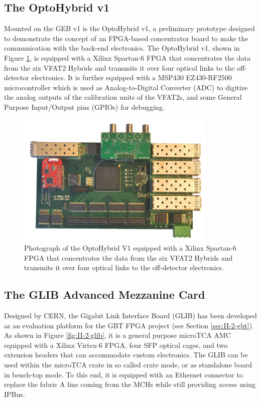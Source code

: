     \subsection{The OptoHybrid v1}

      Mounted on the GEB v1 is the OptoHybrid v1, a preliminary prototype designed to demonstrate the concept of an FPGA-based concentrator board to make the communication with the back-end electronics. The OptoHybrid v1, shown in Figure \ref{fig:II-2-ohv1}, is equipped with a Xilinx Spartan-6 FPGA that concentrates the data from the six VFAT2 Hybrids and transmits it over four optical links to the off-detector electronics. It is further equipped with a MSP430 EZ430-RF2500 \cite{MSP430} microcontroller which is used as Analog-to-Digital Converter (ADC) to digitize the analog outputs of the calibration units of the VFAT2s, and some General Purpose Input/Output pins (GPIOs) for debugging.

      \begin{figure}[b!]
        \centering
        \includegraphics[width=0.85\textwidth]{img/II-2-daq/oh-v1.jpg}
        \caption{Photograph of the OptoHybrid V1 equipped with a Xilinx Spartan-6 FPGA that concentrates the data from the six VFAT2 Hybrids and transmits it over four optical links to the off-detector electronics.}
        \label{fig:II-2-ohv1}
      \end{figure}

    \subsection{The GLIB Advanced Mezzanine Card}

      Designed by CERN, the Gigabit Link Interface Board (GLIB) \cite{Vichoudis:1359270} has been developed as an evaluation platform for the GBT FPGA project (see Section \ref{sec:II-2-gbt}). As shown in Figure \ref{fig:II-2-glib}, it is a general purpose microTCA AMC equipped with a Xilinx Virtex-6 FPGA, four SFP optical cages, and two extension headers that can accommodate custom electronics. The GLIB can be used within the microTCA crate in so called crate mode, or as standalone board in bench-top mode. To this end, it is equipped with an Ethernet connector to replace the fabric A line coming from the MCHs while still providing access using IPBus. \\

